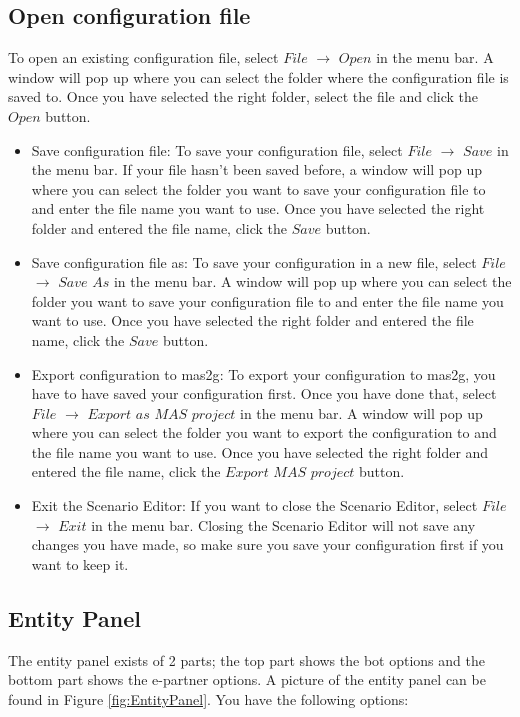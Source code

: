 \documentclass[11pt,a4paper]{article}
\begin{document}
\subsection{Open configuration file}
To open an existing configuration file, select $File$ $\to$ $Open$ in the menu bar. A window will pop up where you can select the folder where the configuration file is saved to. Once you have selected the right folder, select the file and click the $Open$ button.

\begin{itemize}

\item{Save configuration file}:
To save your configuration file, select $File$ $\to$ $Save$ in the menu bar. If your file hasn't been saved before, a window will pop up where you can select the folder you want to save your configuration file to and enter the file name you want to use. Once you have selected the right folder and entered the file name, click the $Save$ button.

\item{Save configuration file as}:
To save your configuration in a new file, select $File$ $\to$ $Save$ $As$ in the menu bar. A window will pop up where you can select the folder you want to save your configuration file to and enter the file name you want to use. Once you have selected the right folder and entered the file name, click the $Save$ button.

\item{Export configuration to mas2g}:
To export your configuration to mas2g, you have to have saved your configuration first. Once you have done that, select $File$ $\to$ $Export$ $as$ $MAS$ $project$ in the menu bar. A window will pop up where you can select the folder you want to export the configuration to and the file name you want to use. Once you have selected the right folder and entered the file name, click the $Export$ $MAS$ $project$ button.

\item{Exit the Scenario Editor}:
If you want to close the Scenario Editor, select $File$ $\to$ $Exit$ in the menu bar. Closing the Scenario Editor will not save any changes you have made, so make sure you save your configuration first if you want to keep it.

\end{itemize}

\subsection{Entity Panel}
The entity panel exists of 2 parts; the top part shows the bot options and the bottom part shows the e-partner options. A picture of the entity panel can be found in Figure \ref{fig:EntityPanel}. You have the following options:
\end{document}
